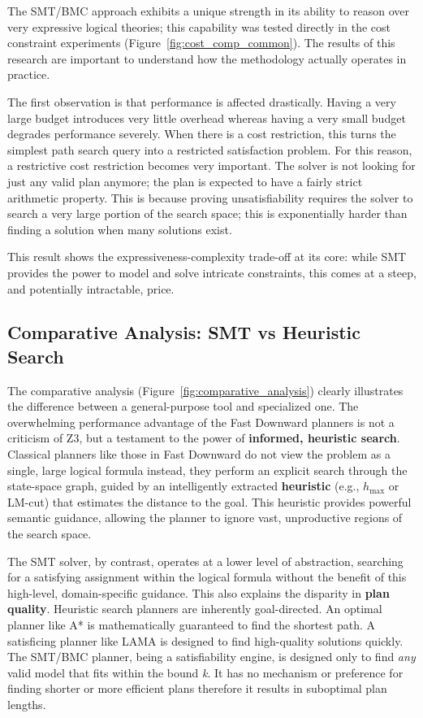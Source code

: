 \documentclass[12pt, a4paper, oneside]{report} %
\begin{document}
The SMT/BMC approach exhibits a unique strength in its ability to reason over very expressive logical theories; this capability was tested directly in the cost constraint experiments (Figure~\ref{fig:cost_comp_common}). The results of this research are important to understand how the methodology actually operates in practice.

The first observation is that performance is affected drastically. Having a very large budget introduces very little overhead whereas having a very small budget degrades performance severely. When there is a cost restriction, this turns the simplest path search query into a restricted satisfaction problem. For this reason, a restrictive cost restriction becomes very important. The solver is not looking for just any valid plan anymore; the plan is expected to have a fairly strict arithmetic property.
This is because proving unsatisfiability requires the solver to search a very large portion of the search space; this is exponentially harder than finding a solution when many solutions exist.

This result shows the expressiveness-complexity trade-off at its core: while SMT provides the power to model and solve intricate constraints, this comes at a steep, and potentially intractable, price.

\subsection*{Comparative Analysis: SMT vs Heuristic Search}

The comparative analysis (Figure~\ref{fig:comparative_analysis}) clearly illustrates the difference between a general-purpose tool and specialized one. The overwhelming performance advantage of the Fast Downward planners is not a criticism of Z3, but a testament to the power of \textbf{informed, heuristic search}. Classical planners like those in Fast Downward do not view the problem as a single, large logical formula instead, they perform an explicit search through the state-space graph, guided by an intelligently extracted \textbf{heuristic} (e.g., $h_{\max}$ or LM-cut) that estimates the distance to the goal. This heuristic provides powerful semantic guidance, allowing the planner to ignore vast, unproductive regions of the search space.

The SMT solver, by contrast, operates at a lower level of abstraction, searching for a satisfying assignment within the logical formula without the benefit of this high-level, domain-specific guidance. This also explains the disparity in \textbf{plan quality}. Heuristic search planners are inherently goal-directed. An optimal planner like A* is mathematically guaranteed to find the shortest path. A satisficing planner like LAMA is designed to find high-quality solutions quickly. The SMT/BMC planner, being a satisfiability engine, is designed only to find \textit{any} valid model that fits within the bound \textit{k}. It has no mechanism or preference for finding shorter or more efficient plans therefore it results in suboptimal plan lengths.
\end{document}
